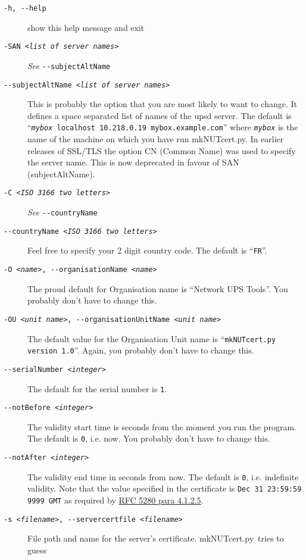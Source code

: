 \documentclass[12pt]{article}
\newcommand{\mkNUTcert}{\mbox{\textcolor{MKNUTCERTCOLOUR}{mkNUTcert.py}}}
\begin{document}
\begin{description}
\item[\texttt{-h, -\/-help}] show this help message and exit
\item[\texttt{-SAN \textit{<list of server names>}}] \textit{See}
  \texttt{-\/-subjectAltName}
\item[\texttt{-\/-subjectAltName \textit{<list of server names>}}] This is
  probably the option that you are most likely to want to change.  It defines
  a space separated list of names of the upsd server.  The default is
  ``\texttt{\textit{mybox} localhost 10.218.0.19 mybox.example.com}'' where
  \texttt{\textit{mybox}} is the name of the machine on which you have run
  \mkNUTcert.  In earlier releases of SSL/TLS the option CN (Common Name) was
  used to specify the server name.  This is now deprecated in favour of SAN
  (subjectAltName).
\item[\texttt{-C \textit{<ISO 3166 two letters>}}] \textit{See}
  \texttt{-\/-countryName}
\item[\texttt{-\/-countryName \textit{<ISO 3166 two letters>}}] Feel free to
  specify your 2 digit country code.  The default is ``\texttt{FR}''.
\item[\texttt{-O \textit{<name>}, -\/-organisationName \textit{<name>}}] The
  proud default for Organisation name is ``Network UPS Tools''.  You probably
  don't have to change this.
\item[\texttt{-OU \textit{<unit name>}, -\/-organisationUnitName \textit{<unit
      name>}}] The default value for the Organisation Unit name is
  ``\texttt{mkNUTcert.py version 1.0}''.  Again, you probably don't have to
  change this.
\item[\texttt{-\/-serialNumber \textit{<integer>}}] The default for the serial
  number is \texttt{1}.
\item[\texttt{-\/-notBefore \textit{<integer>}}] The validity start time is
  seconds from the moment you run the program. The default is \texttt{0},
  i.e. now.  You probably don't have to change this.
\item[\texttt{-\/-notAfter \textit{<integer>}}] The validity end time in
  seconds from now.  The default is \texttt{0}, i.e.  indefinite validity.
  Note that the value specified in the certificate is \texttt{Dec 31 23:59:59
    9999 GMT} as required by
  \href{https://tools.ietf.org/html/rfc5280#section-4.1.2.5}{RFC 5280 para
    4.1.2.5}.
\item[\texttt{-s \textit{<filename>}, -\/-servercertfile \textit{<filename>}}]
  File path and name for the server's certificate.  \mkNUTcert\ tries to guess

\end{description}
\end{document}
